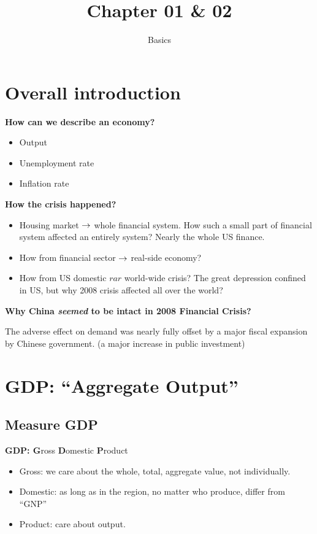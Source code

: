 \documentclass[11pt, a4paper]{ECON2123}
\title{Chapter 01 \& 02}
\subtitle{Basics}
\begin{document}
\begin{spacing}{1.5}
    
    \section{Overall introduction}

    {\bf How can we describe an economy?}
    \begin{itemize}
        \item Output
        \item Unemployment rate
        \item Inflation rate
    \end{itemize}
    
    {\bf How the crisis happened?} 
    \begin{itemize}
        \item Housing market $\rightarrow$ whole financial system. 
        How such a small part of financial system affected an 
        entirely system? Nearly the whole US finance.
        \item How from financial sector $\rightarrow$ real-side economy?
        \item How from US domestic $rar$ world-wide crisis? The great depression 
        confined in US, but why 2008 crisis affected all over the world?
    \end{itemize}

    {\bf Why China {\it seemed} to be intact in 2008 Financial Crisis?}

    The adverse effect on demand was nearly fully offset by 
    a major fiscal expansion by Chinese government. 
    (a major increase in public investment)


    \section{GDP: ``Aggregate Output''}

    \subsection{Measure GDP}

    {\bf GDP: G}ross {\bf D}omestic {\bf P}roduct

    \begin{itemize}
        \item Gross: we care about the whole, total, aggregate value, 
        not individually.
        \item Domestic: as long as in the region, no matter who produce,
        differ from ``GNP''
        \item Product: care about output.
    \end{itemize}


\end{spacing}
\end{document}
